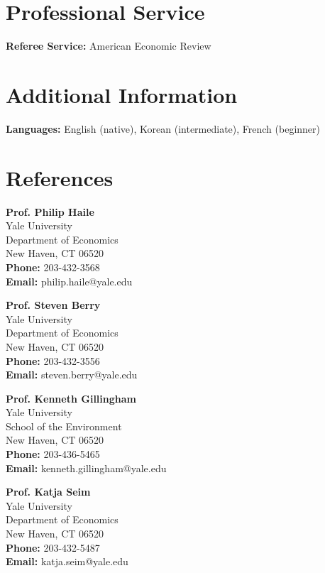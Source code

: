 \documentclass[11pt,letterpaper]{article}
\begin{document}
\section*{Professional Service}

\textbf{Referee Service:} American Economic Review

\section*{Additional Information}

\textbf{Languages:} English (native), Korean (intermediate), French (beginner)

\newpage

\section*{References}

\begin{minipage}[t]{0.48\textwidth}
\textbf{Prof. Philip Haile} \\
Yale University \\
Department of Economics \\
New Haven, CT 06520 \\
\textbf{Phone:} 203-432-3568 \\
\textbf{Email:} philip.haile@yale.edu
\end{minipage}
\hfill
\begin{minipage}[t]{0.48\textwidth}
\textbf{Prof. Steven Berry} \\
Yale University \\
Department of Economics \\
New Haven, CT 06520 \\
\textbf{Phone:} 203-432-3556 \\
\textbf{Email:} steven.berry@yale.edu
\end{minipage}

\vspace{12pt}

\begin{minipage}[t]{0.48\textwidth}
\textbf{Prof. Kenneth Gillingham} \\
Yale University \\
School of the Environment \\
New Haven, CT 06520 \\
\textbf{Phone:} 203-436-5465 \\
\textbf{Email:} kenneth.gillingham@yale.edu
\end{minipage}
\hfill
\begin{minipage}[t]{0.48\textwidth}
\textbf{Prof. Katja Seim} \\
Yale University \\
Department of Economics \\
New Haven, CT 06520 \\
\textbf{Phone:} 203-432-5487 \\
\textbf{Email:} katja.seim@yale.edu
\end{minipage}
\end{document}
